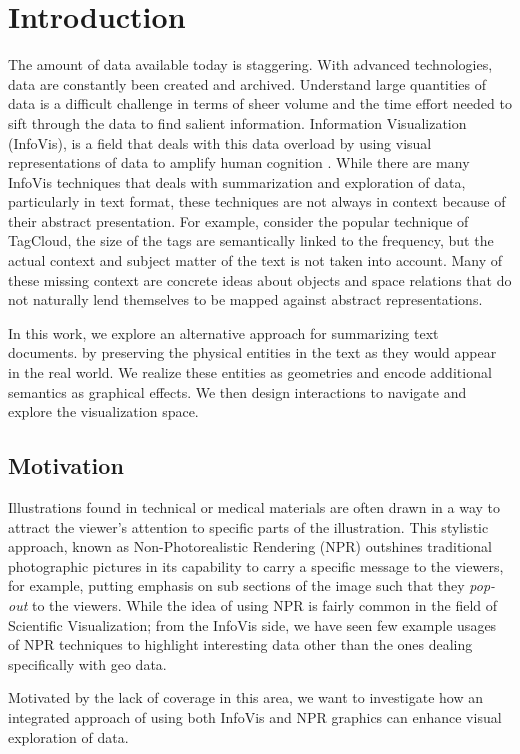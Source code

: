 \chapter{Introduction}
The amount of data available today is staggering. With advanced technologies,
data are constantly been created and archived. Understand large quantities of data is
a difficult challenge in terms of sheer volume and the time effort needed to
sift through the data to find salient information. Information Visualization
(InfoVis), is a field that deals with this data overload by using visual
representations of data to amplify human cognition \cite{Card1999}. While there
are many InfoVis techniques that deals with summarization and exploration of
data, particularly in text format, these techniques are not always in context
because of their abstract presentation. For example, consider the popular
technique of TagCloud, the size of the tags are semantically linked to the
frequency, but the actual context and subject matter of the text is not taken
into account. Many of these missing context are concrete ideas about objects and
space relations that do not naturally lend themselves to be mapped against
abstract representations.
 
In this work, we explore an alternative approach for summarizing text documents.
by preserving the physical entities in the text as they would appear in the real
world. We realize these entities as \threed geometries and encode additional
semantics as graphical effects. We then design interactions to navigate and
explore the \threed visualization space.
   
   
\section{Motivation}
Illustrations found in technical or medical materials are often drawn in a way
to attract the viewer's attention to specific parts of the illustration. This
stylistic approach, known as Non-Photorealistic Rendering (NPR) outshines
traditional photographic pictures in its capability to carry a specific
message to the viewers, for example, putting emphasis on sub sections of the
image such that they \emph{pop-out} to the viewers. While the idea of using 
NPR is fairly common in the field of Scientific Visualization; from the 
InfoVis side, we have seen few example usages of NPR techniques to  highlight
interesting data other than the ones dealing specifically with geo data.
 
Motivated by the lack of coverage in this area, we want to investigate how an
integrated approach of using both InfoVis and NPR graphics can enhance visual
exploration of data.

